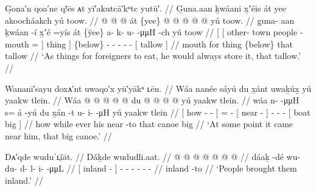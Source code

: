 \ex\label{ex:92-5-put-away-tallow}%
%
\begingl
	\glpreamble	G̣ona′n qoa′ne q!ēs ᴀt yī′akutcā′kᵘtc yutū′. //
	\glpreamble	G̱una.aan ḵwáani x̱ʼéis át yee akoocháakch yú toow. //
	\gla	{} {}  @ {}  @ {}  @ {} {}
			át \{yee\} {}
		 @ {} @ {} @ {} @ {} @ {}
		{} yú toow. {} //
	\glb	{} {} g̱una- aan ḵwáan -í x̱ʼé =yís {} 
			át \{ÿee\} {}
		a- k- u-  -μμH -ch
		{} yú toow {} //
	\glc	{}[ {}[ other- town people - mouth = {}]
			thing {}]
		\{below\} - - -  - -
		{}[  tallow {}] //
	\gld	{} {}  {}  {} mouth \•for {} thing {}
		\{below\}  {} {} {} {} {}
		{} that tallow {} //
	\glft	‘As things for foreigners to eat, he would always store it, that tallow.’
		//
\endgl
\xe


\ex\label{ex:92-6-big-canoe-came-near}%
%
\begingl
	\glpreamble	Wananī′sayu doxᴀ′nt uwaqo′x yū′yākᵘ ʟēn. //
	\glpreamble	Wáa nanée sáyú du x̱ánt uwaḵúx̱ yú yaakw tlein. //
	\gla	{} Wáa  @ {} @ {} @ {} {}
		 @ {} @ {}
		{} du  @ {} {}
		 @ {} @ {} @ {}
		{} yú yaakw tlein. {} //
	\glb	{} wáa n-  -μμH {} {} 
		s= á -yú
		{} du x̱án -t {}
		u- i-  -μH
		{} yú yaakw tlein {} //
	\glc	{}[ how -  - \· {}]
		=  -
		{}[  near - {}]
		- -  -
		{}[  boat big {}] //
	\gld	{} how  {} {} \·while {}
		ever\·  {}
		{} his near -to {}
		 {} {} {}
		{} that canoe big {} //
	\glft	‘At some point it came near him, that big canoe.’
		//
\endgl
\xe

\ex\label{ex:92-7-ppl-brought-them-inland}%
%
\begingl
	\glpreamble	Dᴀ′qde wuduˈʟ̣îāt. //
	\glpreamble	Dáḵde wududli.aat. //
	\gla	{}  @ {} {}  @ {} @ {} @ {} @ {} @ {} @ {} //
	\glb	{} dáaḵ -dé {} wu- du- d- l- i-  -μμL //
	\glc	{}[ inland - {}]
		- - - - -
			 - //
	\gld	{} inland -to {}  {} {} {} {} {} {} //
	\glft	‘People brought them inland.’
		//
\endgl
\xe

